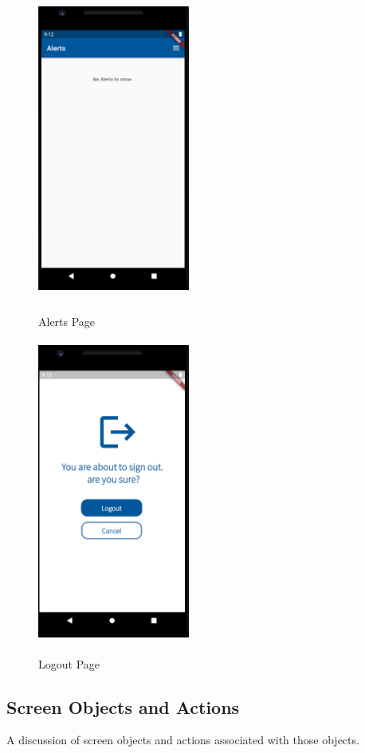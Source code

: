 \documentclass[12pt]{article}
\begin{document}
\begin{figure}[h]
\begin{minipage}[b]{0.5\textwidth}
    \includegraphics[width=5.0cm, height=10.0cm]{Alerts.PNG}
    \caption{Alerts Page}
  \end{minipage}
  \begin{minipage}[b]{0.5\textwidth}
    \includegraphics[width=5.0cm, height=10.0cm]{Logout.PNG}
     \label{fig:2}
   \caption{Logout Page}
  \end{minipage}
  
\label{label1}
\end{figure}

\FloatBarrier

\subsection {Screen Objects and Actions}
A discussion of screen objects and actions associated with those objects.
\end{document}
